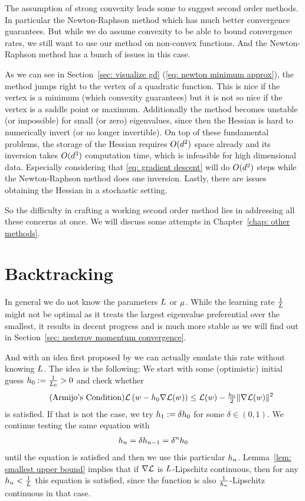 The assumption of strong convexity leads some to suggest second order
methods. In particular the Newton-Raphson method which has much better
convergence guarantees. But while we do assume convexity to be able to bound
convergence rates, we still want to use our method on non-convex functions. And
the Newton-Raphson method has a bunch of issues in this case.

As we can see in Section~\ref{sec: visualize gd} (\ref{eq: newton minimum
approx}), the method jumps right to the vertex of a quadratic function. This is
nice if the vertex is a minimum (which convexity guarantees) but it is not so
nice if the vertex is a saddle point or maximum. Additionally the method becomes
unstable (or impossible) for small (or zero) eigenvalues, since then the Hessian
is hard to numerically invert (or no
longer invertible).
On top of these fundamental problems, the storage of the Hessian requires
\(O(d^2)\) space already and its inversion takes \(O(d^3)\)
computation time, which is infeasible for high dimensional data. Especially
considering that \ref{eq: gradient descent} will do \(O(d^2)\) steps
while the Newton-Raphson method does one inversion. Lastly, there are issues
obtaining the Hessian in a stochastic setting.

So the difficulty in crafting a working second order method lies in addressing
all these concerns at once. We will discuss some attempts in Chapter~\ref{chap:
other methods}.

\section{Backtracking}\label{sec: backtracking}

In general we do not know the parameters \(L\) or \(\mu\). While
the learning rate \(\tfrac1{L}\) might not be optimal as it treats the largest
eigenvalue preferential over the smallest, it results in decent progress and
is much more stable as we will find out in Section~\ref{sec: nesterov momentum convergence}.

And with an idea first proposed by \textcite{armijoMinimizationFunctionsHaving1966}
we can actually emulate this rate without knowing \(L\). The idea is the
following: We start with some (optimistic) initial guess \(h_0 := \tfrac{1}{L_0}>0\) and check
whether
\begin{align}
	\label{eq: armijo's condition}
	\tag{Armijo's Condition}
	\mathcal{L}\left(w - h_0\nabla\mathcal{L}(w)\right)
	\le \mathcal{L}(w) - \tfrac{h_0}{2}\|\nabla\mathcal{L}(w)\|^2
\end{align}
is satisfied. If that is not the case, we try \(h_1 := \delta h_0\)
for some \(\delta\in(0,1)\). We continue testing the same equation with
\begin{align*}
	h_n = \delta h_{n-1} = \delta^n h_0
\end{align*}
until the equation is satisfied and then we use this particular \(h_n\).
Lemma~\ref{lem: smallest upper bound} implies that if \(\nabla\mathcal{L}\) is
\(L\)-Lipschitz continuous, then for any \(h_n < \tfrac{1}{L}\)
this equation is satisfied, since the function is also
\(\tfrac{1}{h_n}\)-Lipschitz continuous in that case.

